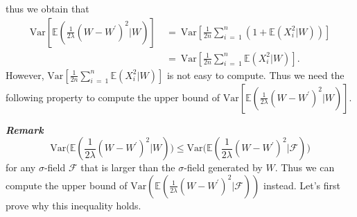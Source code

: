 \documentclass[12pt]{article}
\newcommand{\eq }{\: = \:}
\theoremstyle{nonumberplain}
\begin{document}
thus we obtain that 
\begin{align*}
\mathrm{Var}[\mathbb{E}(\frac{1}{2\lambda}(W-W^{\prime})^{2}|W)]&\eq \mathrm{Var}[\frac{1}{2n}\sum_{i\eq 1}^{n} (1+\mathbb{E}(X_{i}^{2}|W))]\\
&\eq \mathrm{Var}[\frac{1}{2n} \sum_{i\eq 1}^{n} \mathbb{E}(X_{i}^{2}|W)].
\end{align*}
However, $\mathrm{Var}[\frac{1}{2n} \sum_{i\eq 1}^{n} \mathbb{E}(X_{i}^{2}|W)]$ is not easy to compute. Thus we need the following property to compute the upper bound of $\mathrm{Var}[\mathbb{E}(\frac{1}{2\lambda}(W-W^{\prime})^{2}|W)]$.

\noindent
\textbf{{\it Remark\/}}
$$
\mathrm{Var}\bigl(\mathbb{E}(\frac{1}{2\lambda}(W-W^{\prime})^{2}|W)\bigr)\leq \mathrm{Var}\bigl(\mathbb{E}(\frac{1}{2\lambda}(W-W^{\prime})^{2}|\mathcal{F})\bigr)
$$
for any $\sigma$-field $\mathcal{F}$ that is larger than the $\sigma$-field generated by $W$. Thus we can compute the upper bound of $\mathrm{Var}(\mathbb{E}(\frac{1}{2\lambda}(W-W^{\prime})^{2}|\mathcal{F}))$ instead. Let's first prove why this inequality holds.
\end{document}
